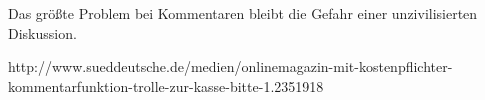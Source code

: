 









Das größte Problem bei Kommentaren bleibt die Gefahr einer unzivilisierten Diskussion. 

http://www.sueddeutsche.de/medien/onlinemagazin-mit-kostenpflichter-kommentarfunktion-trolle-zur-kasse-bitte-1.2351918